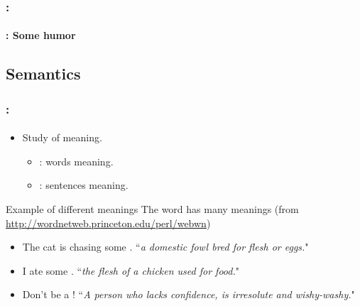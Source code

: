 \documentclass[xcolor=table]{beamer}
\begin{document}
\begin{frame}
	\frametitle{\insertshortsubtitle: \insertsection}
	\framesubtitle{\insertsubsection: Some humor}

	\begin{center}
	\end{center}

\end{frame}

\subsection{Semantics}

\begin{frame}
	\frametitle{\insertshortsubtitle: \insertsection}
	\framesubtitle{\insertsubsection}

	\begin{itemize}
		\item Study of meaning.
		\begin{itemize}
			\item {}: words meaning.
			\item {}: sentences meaning.
		\end{itemize}
	\end{itemize}
	
	\begin{exampleblock}{Example of different meanings}
		The word  has many meanings (from \url{http://wordnetweb.princeton.edu/perl/webwn})
		\begin{itemize}
			\item The cat is chasing some . ``\textit{a domestic fowl bred for flesh or eggs.}"
			\item I ate some . ``\textit{the flesh of a chicken used for food.}"
			\item Don't be a ! ``\textit{A person who lacks confidence, is irresolute and wishy-washy.}"
		\end{itemize}
		
	\end{exampleblock}

\end{frame}
\end{document}
